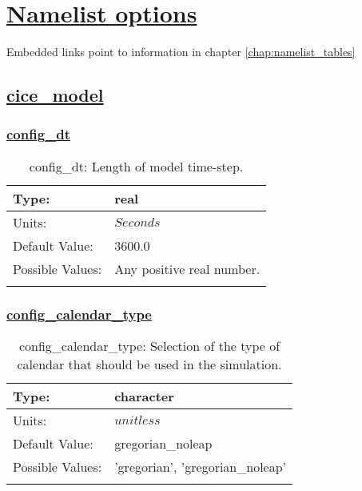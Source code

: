 \chapter[Namelist options]{\hyperref[chap:namelist_tables]{Namelist options}}
\label{chap:namelist_sections}
Embedded links point to information in chapter \ref{chap:namelist_tables}
\section[cice\_model]{\hyperref[sec:nm_tab_cice_model]{cice\_model}}
\label{sec:nm_sec_cice_model}
\subsection[config\_dt]{\hyperref[sec:nm_tab_cice_model]{config\_dt}}
\label{subsec:nm_sec_config_dt}
\begin{center}
\begin{longtable}{| p{2.0in} || p{4.0in} |}
    \hline
    Type: & real \\
    \hline
    Units: & $Seconds$ \\
    \hline
    Default Value: & 3600.0 \\
    \hline
    Possible Values: & Any positive real number. \\
    \hline
    \caption{config\_dt: Length of model time-step.}
\end{longtable}
\end{center}
\subsection[config\_calendar\_type]{\hyperref[sec:nm_tab_cice_model]{config\_calendar\_type}}
\label{subsec:nm_sec_config_calendar_type}
\begin{center}
\begin{longtable}{| p{2.0in} || p{4.0in} |}
    \hline
    Type: & character \\
    \hline
    Units: & $unitless$ \\
    \hline
    Default Value: & gregorian\_noleap \\
    \hline
    Possible Values: & 'gregorian', 'gregorian\_noleap' \\
    \hline
    \caption{config\_calendar\_type: Selection of the type of calendar that should be used in the simulation.}
\end{longtable}
\end{center}
